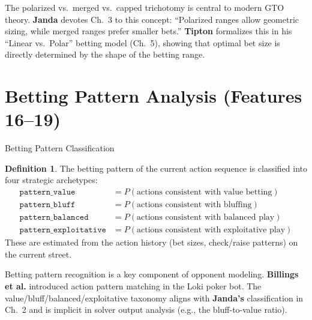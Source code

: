 \documentclass[11pt, a4paper]{article}
\theoremstyle{definition}
\newtheorem{definition}{Definition}[section]
\newcommand{\feature}[1]{\texttt{#1}}
\begin{document}
\begin{refbox}
The polarized vs.\ merged vs.\ capped trichotomy is central to modern GTO theory. \textbf{Janda} \cite{janda2017} devotes Ch.~3 to this concept: ``Polarized ranges allow geometric sizing, while merged ranges prefer smaller bets.'' \textbf{Tipton} \cite{tipton2019} formalizes this in his ``Linear vs.\ Polar'' betting model (Ch.~5), showing that optimal bet size is directly determined by the shape of the betting range.
\end{refbox}

\section{Betting Pattern Analysis (Features 16--19)}

\begin{featurebox}{Betting Pattern Classification}
\begin{definition}
The betting pattern of the current action sequence is classified into four strategic archetypes:
\begin{align}
    \feature{pattern\_value} &= P(\text{actions consistent with value betting}) \\
    \feature{pattern\_bluff} &= P(\text{actions consistent with bluffing}) \\
    \feature{pattern\_balanced} &= P(\text{actions consistent with balanced play}) \\
    \feature{pattern\_exploitative} &= P(\text{actions consistent with exploitative play})
\end{align}
These are estimated from the action history (bet sizes, check/raise patterns) on the current street.
\end{definition}
\end{featurebox}

\begin{refbox}
Betting pattern recognition is a key component of opponent modeling. \textbf{Billings et al.} \cite{billings2002} introduced action pattern matching in the Loki poker bot. The value/bluff/balanced/exploitative taxonomy aligns with \textbf{Janda's} \cite{janda2017} classification in Ch.~2 and is implicit in solver output analysis (e.g., the bluff-to-value ratio).
\end{refbox}

\end{document}
